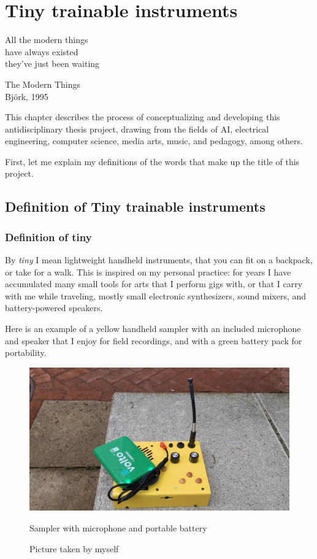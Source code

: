 \chapter{Tiny trainable instruments}

\epigraph{All the modern things \\ have always existed \\ they've just been waiting}{The Modern Things \\ Björk, 1995}

This chapter describes the process of conceptualizing and developing this antidisciplinary thesis project, drawing from the fields of \acrlong{AI}, electrical engineering, computer science, media arts, music, and pedagogy, among others.

First, let me explain my definitions of the words that make up the title of this project.

\section{Definition of Tiny trainable instruments}

\subsection{Definition of tiny}

By \emph{tiny} I mean lightweight handheld instruments, that you can fit on a backpack, or take for a walk. This is inspired on my personal practice: for years I have accumulated many small tools for arts that I perform gigs with, or that I carry with me while traveling, mostly small electronic synthesizers, sound mixers, and battery-powered speakers.

Here is an example of a yellow handheld sampler with an included microphone and speaker that I enjoy for field recordings, and with a green battery pack for portability.

\begin{figure}[ht]
  \centering
  \includegraphics[width=0.75\linewidth,height=0.25\textheight,keepaspectratio]{images/critter-and-guitari-kaleidoloop-battery.jpg}
  \caption{Sampler with microphone and portable battery}
  \caption*{Picture taken by myself}
  \label{fig:critter-and-guitari-kaleidoloop-battery}
\end{figure}

